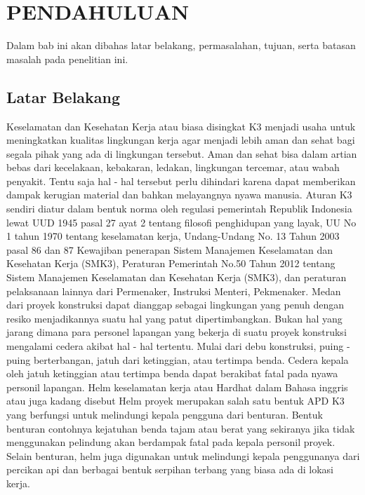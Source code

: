 \chapter{PENDAHULUAN}
\label{chap:pendahuluan}


Dalam bab ini akan dibahas latar belakang, permasalahan, tujuan, serta batasan masalah pada penelitian ini.

\section{Latar Belakang}
\label{sec:latarbelakang}

Keselamatan dan Kesehatan Kerja atau biasa disingkat K3 menjadi usaha untuk meningkatkan kualitas lingkungan kerja agar menjadi lebih aman dan sehat bagi segala pihak yang ada di lingkungan tersebut. Aman dan sehat bisa dalam artian bebas dari kecelakaan, kebakaran, ledakan, lingkungan tercemar, atau wabah penyakit. Tentu saja hal - hal tersebut perlu dihindari karena dapat memberikan dampak kerugian material dan bahkan melayangnya nyawa manusia. Aturan K3 sendiri diatur dalam bentuk norma oleh regulasi pemerintah Republik Indonesia lewat UUD 1945 pasal 27 ayat 2 tentang filosofi penghidupan yang layak, UU No 1 tahun 1970 tentang keselamatan kerja, Undang-Undang No. 13 Tahun 2003 pasal 86 dan 87 Kewajiban penerapan Sistem Manajemen Keselamatan dan Kesehatan Kerja (SMK3), Peraturan Pemerintah No.50 Tahun 2012 tentang Sistem Manajemen Keselamatan dan Kesehatan Kerja (SMK3), dan peraturan pelaksanaan lainnya dari Permenaker, Instruksi Menteri, Pekmenaker.  \cite{ahlik3umum-k3indonesia_2021}
Medan dari proyek konstruksi dapat dianggap sebagai lingkungan yang penuh dengan resiko menjadikannya suatu hal yang patut dipertimbangkan. Bukan hal yang jarang dimana para personel lapangan yang bekerja di suatu proyek konstruksi mengalami cedera akibat hal - hal tertentu. Mulai dari debu konstruksi, puing - puing berterbangan, jatuh dari ketinggian, atau tertimpa benda. Cedera kepala oleh jatuh ketinggian atau tertimpa benda dapat berakibat fatal pada nyawa personil lapangan. \cite{li2020deep}
Helm keselamatan kerja atau Hardhat dalam Bahasa inggris atau juga kadang disebut Helm proyek merupakan salah satu bentuk APD K3 yang berfungsi untuk melindungi kepala pengguna dari benturan. Bentuk benturan contohnya kejatuhan benda tajam atau berat yang sekiranya jika tidak menggunakan pelindung akan berdampak fatal pada kepala personil proyek. Selain benturan, helm juga digunakan untuk melindungi kepala penggunanya dari percikan api dan berbagai bentuk serpihan terbang yang biasa ada di lokasi kerja.\cite{k3_mutiaramutu}
